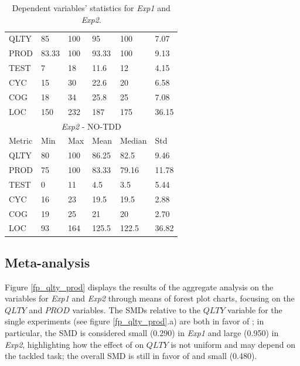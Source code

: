 \begin{table}[H]
\begin{center}
\begin{tabular}{ |p{2cm}||p{1.6cm}|p{1.6cm}|p{1.6cm}|p{1.6cm}|p{1.6cm}|}
            \hline
                QLTY & 85 & 100 & 95 & 100 & 7.07 \\
                PROD & 83.33 & 100 & 93.33 & 100 & 9.13 \\
                TEST & 7 & 18 & 11.6 & 12 & 4.15 \\
                CYC & 15 & 30 & 22.6 & 20 & 6.58 \\
                COG & 18 & 34 & 25.8 & 25 & 7.08 \\
                LOC & 150 & 232 & 187 & 175 & 36.15 \\
            \hline\hline
                \multicolumn{6}{|c|}{\textit{Exp2} - NO-TDD} \\
            \hline
                Metric & Min & Max & Mean & Median & Std\\
            \hline
                QLTY & 80 & 100 & 86.25 & 82.5 & 9.46 \\
                PROD & 75 & 100 & 83.33 & 79.16 & 11.78 \\
                TEST & 0 & 11 & 4.5 & 3.5 & 5.44 \\
                CYC & 16 & 23 & 19.5 & 19.5 & 2.88 \\
                COG & 19 & 25 & 21 & 20 & 2.70 \\
                LOC & 93 & 164 & 125.5 & 122.5 & 36.82 \\
            \hline
        \end{tabular}
        \caption{\label{tab_dv_t1_2}Dependent variables' statistics for \textit{Exp1} and \textit{Exp2}.}
    \end{center}
\end{table}



\subsection{Meta-analysis}
Figure \ref{fp_qlty_prod} displays the results of the aggregate analysis on the variables for \textit{Exp1} and \textit{Exp2} through means of forest plot charts, focusing on the $QLTY$ and $PROD$ variables.
The SMDs relative to the $QLTY$ variable for the single experiments (see figure \ref{fp_qlty_prod}.a) are both in favor of \tdd; in particular, the SMD is considered small (0.290) in \textit{Exp1} and large (0.950) in \textit{Exp2}, highlighting how the effect of \tdd on $QLTY$ is not uniform and may depend on the tackled task; the overall SMD is still in favor of \tdd and small (0.480).

